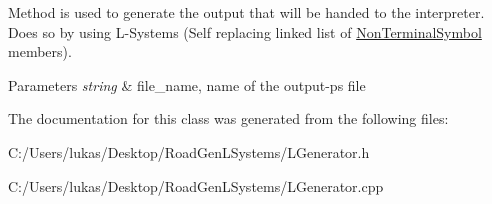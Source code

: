 Method is used to generate the output that will be handed to the interpreter. Does so by using L-\/\+Systems (Self replacing linked list of \hyperlink{class_non_terminal_symbol}{Non\+Terminal\+Symbol} members).


\begin{DoxyParams}{Parameters}
{\em string} & file\+\_\+name, name of the output-\/ps file \\
\hline
\end{DoxyParams}


The documentation for this class was generated from the following files\+:\begin{DoxyCompactItemize}
\item 
C\+:/\+Users/lukas/\+Desktop/\+Road\+Gen\+L\+Systems/L\+Generator.\+h\item 
C\+:/\+Users/lukas/\+Desktop/\+Road\+Gen\+L\+Systems/L\+Generator.\+cpp\end{DoxyCompactItemize}
